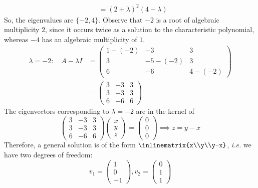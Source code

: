 \begin{exm}
\begin{flushleft}
\begin{align*}
			                    & = (2+\lambda)^2(4-\lambda)
		\end{align*}
		So, the eigenvalues are $\{-2,4\}$. Observe that $-2$ is a root of
		algebraic multiplicity $2$, since it occurs twice as a solution to the
		characteristic polynomial, whereas $-4$ has an algebraic multiplicity of $1$.
		\begin{align*}
			\boxed{\lambda=-2}:\quad A- \lambda I & = \begin{pmatrix}
				1-(-2) & -3      & 3      \\
				3      & -5-(-2) & 3      \\
				6      & -6      & 4-(-2)
			\end{pmatrix} \\
			                                      & = \begin{pmatrix}
				3 & -3 & 3 \\
				3 & -3 & 3 \\
				6 & -6 & 6
			\end{pmatrix}
		\end{align*}
		The eigenvectors corresponding to $\lambda=-2$ are in the kernel of
		\begin{equation*}
			\begin{pmatrix}
				3 & -3 & 3 \\
				3 & -3 & 3 \\
				6 & -6 & 6
			\end{pmatrix}\begin{pmatrix}
				x \\ y \\ z
			\end{pmatrix}=
			\begin{pmatrix}
				0 \\ 0 \\ 0
			\end{pmatrix}\implies z=y-x
		\end{equation*}
		Therefore, a general solution is of the form $\inlinematrix{x\\y\\y-x}$,
		\textit{i.e.} we have two degrees of freedom:
		\begin{equation*}
			v_1=\begin{pmatrix}
				1 \\ 0 \\ -1
			\end{pmatrix},v_2=\begin{pmatrix}
				0 \\ 1 \\ 1

\end{pmatrix}
\end{equation*}
\end{flushleft}
\end{exm}
